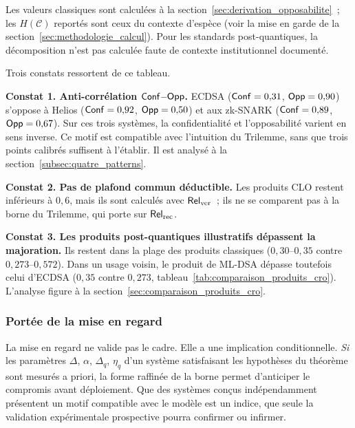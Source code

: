 \begin{sloppypar}
\begin{table}[htbp]
\vspace{0.3em}
\footnotesize
Les valeurs classiques sont calcul\'ees \`a la
section~\ref{sec:derivation_opposabilite}~; les $H(\mathcal{C})$ report\'es
sont ceux du contexte d'esp\`ece (voir la mise en garde de la
section~\ref{sec:methodologie_calcul}). Pour les standards
post-quantiques, la d\'ecomposition n'est pas calcul\'ee faute de contexte
institutionnel document\'e.
\end{table}

Trois constats ressortent de ce tableau.

\textbf{Constat 1. Anti-corr\'elation $\mathsf{Conf}$--$\mathsf{Opp}$.} ECDSA
($\mathsf{Conf} = 0{,}31$, $\mathsf{Opp} = 0{,}90$) s'oppose \`a Helios ($\mathsf{Conf} = 0{,}92$,
$\mathsf{Opp} = 0{,}50$) et aux zk-SNARK ($\mathsf{Conf} = 0{,}89$, $\mathsf{Opp} = 0{,}67$). Sur ces trois syst\`emes, la
confidentialit\'e et l'opposabilit\'e varient en sens inverse. Ce motif est compatible avec l'intuition du Trilemme, sans que trois points
calibr\'es suffisent \`a l'\'etablir. Il est analys\'e \`a la
section~\ref{subsec:quatre_patterns}.

\textbf{Constat 2. Pas de plafond commun d\'eductible.} Les produits CLO
restent inf\'erieurs \`a $0{,}6$, mais ils sont calcul\'es avec $\mathsf{Rel}_{\mathrm{ver}}$~; ils ne se
comparent pas \`a la borne du Trilemme, qui porte sur $\mathsf{Rel}_{\mathrm{rec}}$.

\textbf{Constat 3. Les produits post-quantiques illustratifs d\'epassent la
majoration.} Ils restent dans la plage des produits classiques
($0{,}30$--$0{,}35$ contre $0{,}273$--$0{,}572$). Dans un usage voisin, le produit de
ML-DSA d\'epasse toutefois celui d'ECDSA ($0{,}35$ contre $0{,}273$,
tableau~\ref{tab:comparaison_produits_cro}). L'analyse figure \`a la
section~\ref{sec:comparaison_produits_cro}.

\subsubsection{Port\'ee de la mise en regard}
\label{subsubsec:implications_concordance}

La mise en regard ne valide pas le cadre. Elle a une implication
conditionnelle. \emph{Si} les param\`etres $\Delta$, $\alpha$,
$\Delta_q$, $\eta_q$ d'un syst\`eme satisfaisant les hypoth\`eses du th\'eor\`eme
sont mesur\'es a priori, la forme raffin\'ee de la borne permet d'anticiper le
compromis avant d\'eploiement. Que des syst\`emes con\c{c}us ind\'ependamment
pr\'esentent un motif compatible avec le mod\`ele est un indice, que seule la
validation exp\'erimentale prospective pourra confirmer ou infirmer.


\end{sloppypar}
